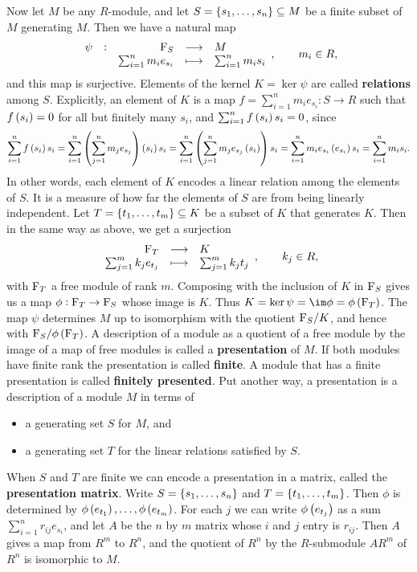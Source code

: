 Now let $ M $ be any $ R $-module, and let $ S = \cbr{s_1, \dots, s_n} \subseteq M $ be a finite subset of $ M $ generating $ M $. Then we have a natural map
$$ \function[\psi]{\F_S}{M}{\sum_{i = 1}^n m_ie_{s_i}}{\sum_{i = 1}^n m_is_i}, \qquad m_i \in R, $$
and this map is surjective. Elements of the kernel $ K = \ker \psi $ are called \textbf{relations} among $ S $. Explicitly, an element of $ K $ is a map $ f = \sum_{i = 1}^n m_ie_{s_i} : S \to R $ such that $ f\br{s_i} = 0 $ for all but finitely many $ s_i $, and $ \sum_{i = 1}^n f\br{s_i}s_i = 0 $, since
$$ \sum_{i = 1}^n f\br{s_i}s_i = \sum_{i = 1}^n \br{\sum_{j = 1}^n m_je_{s_j}}\br{s_i}s_i = \sum_{i = 1}^n \br{\sum_{j = 1}^n m_je_{s_j}\br{s_i}}s_i = \sum_{i = 1}^n m_ie_{s_i}\br{e_{s_i}}s_i = \sum_{i = 1}^n m_is_i. $$
In other words, each element of $ K $ encodes a linear relation among the elements of $ S $. It is a measure of how far the elements of $ S $ are from being linearly independent. Let $ T = \cbr{t_1, \dots, t_m} \subseteq K $ be a subset of $ K $ that generates $ K $. Then in the same way as above, we get a surjection
$$ \function{\F_T}{K}{\sum_{j = 1}^m k_je_{t_j}}{\sum_{j = 1}^m k_jt_j}, \qquad k_j \in R, $$
with $ \mathrm{F}_T $ a free module of rank $ m $. Composing with the inclusion of $ K $ in $ \mathrm{F}_S $ gives us a map $ \phi : \mathrm{F}_T \to \mathrm{F}_S $ whose image is $ K $. Thus $ K = \ker \psi = \im \phi = \phi\br{\F_T} $. The map $ \psi $ determines $ M $ up to isomorphism with the quotient $ \mathrm{F}_S / K $, and hence with $ \F_S / \phi\br{\F_T} $. A description of a module as a quotient of a free module by the image of a map of free modules is called a \textbf{presentation} of $ M $. If both modules have finite rank the presentation is called \textbf{finite}. A module that has a finite presentation is called \textbf{finitely presented}. Put another way, a presentation is a description of a module $ M $ in terms of
\begin{itemize}
\item a generating set $ S $ for $ M $, and
\item a generating set $ T $ for the linear relations satisfied by $ S $.
\end{itemize}

When $ S $ and $ T $ are finite we can encode a presentation in a matrix, called the \textbf{presentation matrix}. Write $ S = \cbr{s_1, \dots, s_n} $ and $ T = \cbr{t_1, \dots, t_m} $. Then $ \phi $ is determined by $ \phi\br{e_{t_1}}, \dots, \phi\br{e_{t_m}} $. For each $ j $ we can write $ \phi\br{e_{t_j}} $ as a sum $ \sum_{i = 1}^n r_{ij}e_{s_i} $, and let $ A $ be the $ n $ by $ m $ matrix whose $ i $ and $ j $ entry is $ r_{ij} $. Then $ A $ gives a map from $ R^m $ to $ R^n $, and the quotient of $ R^n $ by the $ R $-submodule $ AR^m $ of $ R^n $ is isomorphic to $ M $.

